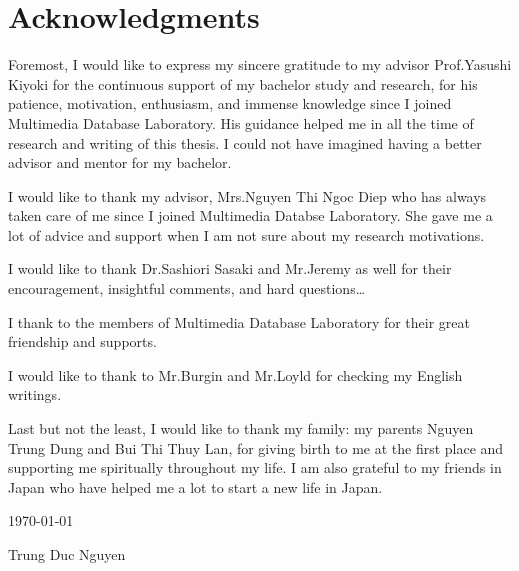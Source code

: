 \chapter*{Acknowledgments}

Foremost, I would like to express my sincere gratitude to my advisor Prof.Yasushi Kiyoki for the continuous support of my bachelor study and research, for his patience, motivation, enthusiasm, and immense knowledge since I joined Multimedia Database Laboratory. His guidance helped me in all the time of research and writing of this thesis. I could not have imagined having a better advisor and mentor for my bachelor.

I would like to thank my advisor, Mrs.Nguyen Thi Ngoc Diep who has always taken care of me since I joined Multimedia Databse Laboratory. She gave me a lot of advice and support when I am not sure about my research motivations. 

I would like to thank Dr.Sashiori Sasaki and Mr.Jeremy as well for their encouragement, insightful comments, and hard questions\ldots

I thank to the members of Multimedia Database Laboratory for their great friendship and supports.

I would like to thank to Mr.Burgin and Mr.Loyld for checking my English writings.

Last but not the least, I would like to thank my family: my parents Nguyen Trung Dung and Bui Thi Thuy Lan, for giving birth to me at the first place and supporting me spiritually throughout my life. I am also grateful to my friends in Japan who have helped me a lot to start a new life in Japan. 

\begin{flushright}
\today

Trung Duc Nguyen 
\end{flushright}
